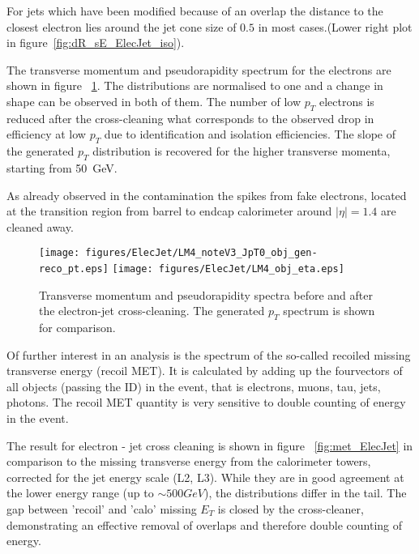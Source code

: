 \documentclass{cmspaper}
\begin{document}
For jets which have been modified because of an overlap the distance to the
closest electron lies around the jet cone size of $0.5$ in most cases.(Lower
right plot in figure~\ref{fig:dR_sE_ElecJet_iso}).

The transverse momentum and pseudorapidity spectrum for the electrons are shown
in figure ~\ref{fig:objSpectra_ElecJet}. The distributions are normalised to one
and a change in shape can be observed in both of them. The number of low $p_T$
electrons is reduced after the cross-cleaning what corresponds to the observed
drop in efficiency at low $p_T$ due to identification and isolation
efficiencies. The slope of the generated $p_T$ distribution is recovered for
the higher transverse momenta, starting from 50\ GeV.

As already observed in the contamination the spikes from fake
electrons, located at the transition region from barrel to endcap calorimeter
around $|\eta|=1.4$ are cleaned away.

\begin{figure}[hb]
\begin{center}
    \texttt{[image: figures/ElecJet/LM4\_noteV3\_JpT0\_obj\_gen-reco\_pt.eps]}
    \texttt{[image: figures/ElecJet/LM4\_obj\_eta.eps]}
    \caption{Transverse momentum and pseudorapidity spectra before
    and after the electron-jet cross-cleaning. The generated $p_T$ spectrum is
    shown for comparison.}
\label{fig:objSpectra_ElecJet}
\end{center}
\end{figure}

Of further interest in an analysis is the spectrum of the so-called recoiled
missing transverse energy (recoil MET). It is calculated by adding up the
fourvectors of all objects (passing the ID) in the event, that is electrons,
muons, tau, jets, photons. The recoil MET quantity is very sensitive to
double counting of energy in the event.

The result for electron - jet cross cleaning is shown in figure
~\ref{fig:met_ElecJet} in comparison to the missing transverse energy from the
calorimeter towers, corrected for the jet energy scale (L2, L3). While they are
in good agreement at the lower energy range (up to \(\sim 500 GeV\)), the
distributions differ in the tail. The gap between 'recoil' and 'calo' missing
$E_T$ is closed by the cross-cleaner, demonstrating an effective removal of
overlaps and therefore double counting of energy.
\end{document}
